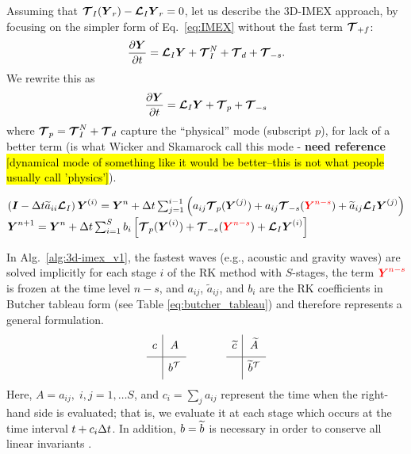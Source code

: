 \documentclass{report}
\begin{document}
{Assuming that $\boldsymbol{{\mathcal{T}}}_I(\boldsymbol{{Y}}_r) - \boldsymbol{{\mathcal{L}}}_I \boldsymbol{{Y}}_r=0$, let us
describe the 3D-IMEX approach, by focusing on the simpler form of Eq.\ \eqref{eq:IMEX} without the fast term $\boldsymbol{{\mathcal{T}}}_{+f}$: 
\begin{equation}
\label{eq:IMEX_v2}
\frac{\partial\boldsymbol{{Y}}}{\partial t} =  \boldsymbol{{\mathcal{L}}}_I \boldsymbol{{Y}} + \boldsymbol{{\mathcal{T}}}^N_{I} + \boldsymbol{{\mathcal{T}}}_{d} + \boldsymbol{{\mathcal{T}}}_{-s}.
\end{equation}
We rewrite this as
\begin{equation}
\label{eq:IMEX_v3}
\frac{\partial\boldsymbol{{Y}}}{\partial t} =  \boldsymbol{{\mathcal{L}}}_I \boldsymbol{{Y}} + \boldsymbol{{\mathcal{T}}}_{p} + \boldsymbol{{\mathcal{T}}}_{-s}
\end{equation}
where $\boldsymbol{{\mathcal{T}}}_{p}=\boldsymbol{{\mathcal{T}}}^N_{I} + \boldsymbol{{\mathcal{T}}}_{d}$ capture the ``physical'' mode (subscript $p$), for lack of a better term (is what Wicker and Skamarock call this mode - \textbf{need reference} \hl{[dynamical mode of something like it would be better--this is not what people usually call 'physics']}).
\begin{algorithm}
\label{alg:3d-imex_v1}
\begin{algorithmic}
\State
{}
\State $\left( \boldsymbol{{I}} - \Delta t \widetilde{a}_{ii} \boldsymbol{{\mathcal{L}}}_I \right) \boldsymbol{{Y}}^{(i)}=\boldsymbol{{Y}}^{n} + \Delta t \sum_{j=1}^{i-1} \left( a_{ij} \boldsymbol{{\mathcal{T}}}_{p}(\boldsymbol{{Y}}^{(j)}) + a_{ij} \boldsymbol{{\mathcal{T}}}_{-s}(\textcolor{red}{\boldsymbol{{Y}}^{n-s}})
+ \widetilde{a}_{ij} \boldsymbol{{\mathcal{L}}}_I \boldsymbol{{Y}}^{(j)} \right)$ 
\EndFor %
\State $\boldsymbol{{Y}}^{n+1}=\boldsymbol{{Y}}^{n} + \Delta t \sum_{i=1}^{S} b_{i} \left[ \boldsymbol{{\mathcal{T}}}_{p}(\boldsymbol{{Y}}^{(i)}) + \boldsymbol{{\mathcal{T}}}_{-s}(\textcolor{red}{\boldsymbol{{Y}}^{n-s}})
+ \boldsymbol{{\mathcal{L}}}_I \boldsymbol{{Y}}^{(i)} \right]$
\EndFunction
\end{algorithmic}
\end{algorithm}
In Alg.\ \ref{alg:3d-imex_v1}, the fastest waves (e.g., acoustic and gravity waves) are solved implicitly for each stage $i$ of the RK method with $S$-stages, the term $\textcolor{red}{\boldsymbol{{Y}}^{n-s}}$ is frozen at the time level $n-s$, and $a_{ij}$, $\widetilde{a}_{ij}$, and $b_i$ are the RK coefficients in Butcher tableau form (see Table \ref{eq:butcher_tableau}) and therefore represents a general formulation.
\begin{equation}
\begin{array}{c|c}
\ST c&A\\
\hline
\ST  & b\transpose
\end{array}
\hspace{0.5in}
\begin{array}{c|c}
\ST \wt{c} & \wt{A} \\
\hline
\ST  & \wt{b} \transpose
\end{array}
\label{eq:butcher_tableau}
\end{equation}
Here, $A=a_{ij}, \; i,j=1,\ldots S$, and $c_i=\sum_{j} a_{ij}$ represent the time when the right-hand side is evaluated; that is, we evaluate it at each stage which occurs at the time interval $t+c_i {\Delta t}$.
In addition, $b=\widetilde{b}$ is necessary in order to conserve all linear invariants \cite{giraldo:2013}.

}
\end{document}
